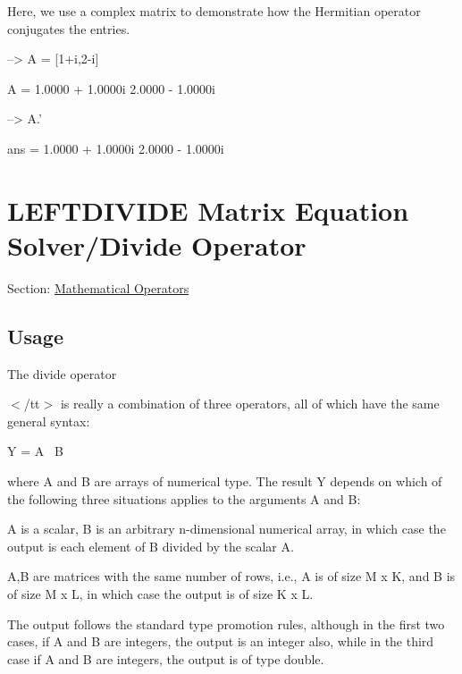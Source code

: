 Here, we use a complex matrix to demonstrate how the Hermitian operator conjugates the entries.


\begin{DoxyVerbInclude}
--> A = [1+i,2-i]

A = 
   1.0000 +  1.0000i   2.0000 -  1.0000i 

--> A.'

ans = 
   1.0000 +  1.0000i 
   2.0000 -  1.0000i 
\end{DoxyVerbInclude}
 \hypertarget{operators_leftdivide}{}\section{L\-E\-F\-T\-D\-I\-V\-I\-D\-E Matrix Equation Solver/\-Divide Operator}\label{operators_leftdivide}
Section\-: \hyperlink{sec_operators}{Mathematical Operators} \hypertarget{vtkwidgets_vtkxyplotwidget_Usage}{}\subsection{Usage}\label{vtkwidgets_vtkxyplotwidget_Usage}
The divide operator {\ttfamily $<$/tt$>$ is really a combination of three operators, all of which have the same general syntax\-: \begin{DoxyVerb}  Y = A \ B
\end{DoxyVerb}
 where {\ttfamily A} and {\ttfamily B} are arrays of numerical type. The result {\ttfamily Y} depends on which of the following three situations applies to the arguments {\ttfamily A} and {\ttfamily B}\-: 
\begin{DoxyEnumerate}
\item {\ttfamily A} is a scalar, {\ttfamily B} is an arbitrary {\ttfamily n}-\/dimensional numerical array, in which case the output is each element of {\ttfamily B} divided by the scalar {\ttfamily A}.  
\item {\ttfamily A,B} are matrices with the same number of rows, i.\-e., {\ttfamily A} is of size {\ttfamily M x K}, and {\ttfamily B} is of size {\ttfamily M x L}, in which case the output is of size {\ttfamily K x L}.  
\end{DoxyEnumerate}The output follows the standard type promotion rules, although in the first two cases, if {\ttfamily A} and {\ttfamily B} are integers, the output is an integer also, while in the third case if {\ttfamily A} and {\ttfamily B} are integers, the output is of type {\ttfamily double}.}

